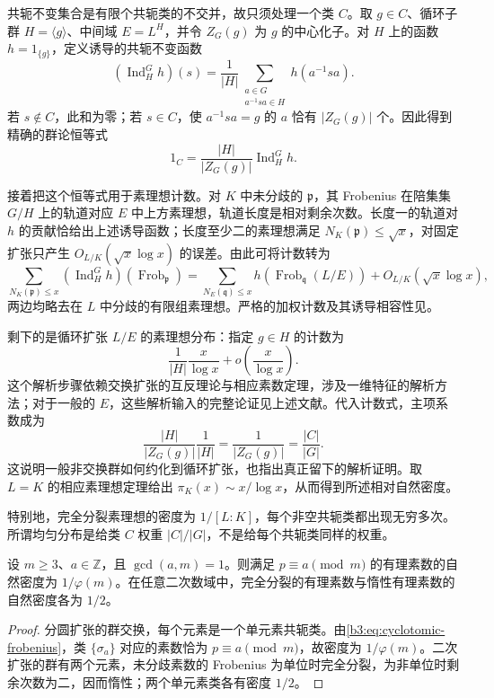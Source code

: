 \begin{proofsketch}
	共轭不变集合是有限个共轭类的不交并，故只须处理一个类 \(C\)。取 \(g\in C\)、循环子群 \(H=\langle g\rangle\)、中间域 \(E=L^H\)，并令 \(Z_G(g)\) 为 \(g\) 的中心化子。对 \(H\) 上的函数 \(h=1_{\{g\}}\)，定义诱导的共轭不变函数
	\[
		(\operatorname{Ind}_H^G h)(s)
		=\dfrac1{|H|}\sum_{\substack{a\in G\\a^{-1}sa\in H}}h(a^{-1}sa).
	\]
	若 \(s\notin C\)，此和为零；若 \(s\in C\)，使 \(a^{-1}sa=g\) 的 \(a\) 恰有 \(|Z_G(g)|\) 个。因此得到精确的群论恒等式
	\[
		1_C=\dfrac{|H|}{|Z_G(g)|}\operatorname{Ind}_H^G h.
	\]

	接着把这个恒等式用于素理想计数。对 \(K\) 中未分歧的 \(\mathfrak p\)，其 Frobenius 在陪集集 \(G/H\) 上的轨道对应 \(E\) 中上方素理想，轨道长度是相对剩余次数。长度一的轨道对 \(h\) 的贡献恰给出上述诱导函数；长度至少二的素理想满足 \(N_K(\mathfrak p)\le\sqrt x\)，对固定扩张只产生 \(O_{L/K}(\sqrt x\log x)\) 的误差。由此可将计数转为
	\[
		\sum_{N_K(\mathfrak p)\le x}
		(\operatorname{Ind}_H^G h)(\operatorname{Frob}_{\mathfrak p})
		=\sum_{N_E(\mathfrak q)\le x}h(\operatorname{Frob}_{\mathfrak q}(L/E))
		+O_{L/K}(\sqrt x\log x),
	\]
	两边均略去在 \(L\) 中分歧的有限组素理想。严格的加权计数及其诱导相容性见\cite[Section 2.6, Proposition 8, pp. 139--140]{Serre1981ChebotarevApplications}。

	剩下的是循环扩张 \(L/E\) 的素理想分布：指定 \(g\in H\) 的计数为
	\[
		\dfrac1{|H|}\dfrac{x}{\log x}
		+o\!\left(\dfrac{x}{\log x}\right).
	\]
	这个解析步骤依赖交换扩张的互反理论与相应素数定理，涉及一维特征的解析方法；对于一般的 \(E\)，这些解析输入的完整论证见上述文献。代入计数式，主项系数成为
	\[
		\dfrac{|H|}{|Z_G(g)|}\dfrac1{|H|}
		=\dfrac1{|Z_G(g)|}=\dfrac{|C|}{|G|}.
	\]
	这说明一般非交换群如何约化到循环扩张，也指出真正留下的解析证明。取 \(L=K\) 的相应素理想定理给出 \(\pi_K(x)\sim x/\log x\)，从而得到所述相对自然密度。
\end{proofsketch}

特别地，完全分裂素理想的密度为 \(1/[L:K]\)，每个非空共轭类都出现无穷多次。所谓均匀分布是给类 \(C\) 权重 \(|C|/|G|\)，不是给每个共轭类同样的权重。

\begin{corollary}\label{b3:cor:cyclotomic-prime-density}
	设 \(m\ge3\)、\(a\in\mathbb Z\)，且 \(\gcd(a,m)=1\)。则满足 \(p\equiv a\pmod m\) 的有理素数的自然密度为 \(1/\varphi(m)\)。在任意二次数域中，完全分裂的有理素数与惰性有理素数的自然密度各为 \(1/2\)。
\end{corollary}
\begin{proof}
	分圆扩张的群交换，每个元素是一个单元素共轭类。由\eqref{b3:eq:cyclotomic-frobenius}，类 \(\{\sigma_a\}\) 对应的素数恰为 \(p\equiv a\pmod m\)，故密度为 \(1/\varphi(m)\)。二次扩张的群有两个元素，未分歧素数的 Frobenius 为单位时完全分裂，为非单位时剩余次数为二，因而惰性；两个单元素类各有密度 \(1/2\)。
\end{proof}

